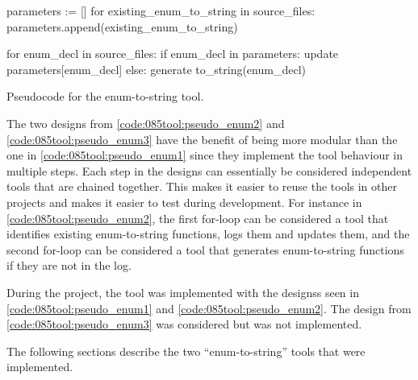 \begin{listing}[H]
    \begin{pythoncode}
parameters := []
for existing_enum_to_string in source_files:
    parameters.append(existing_enum_to_string)

for enum_decl in source_files:
    if enum_decl in parameters:
        update parameters[enum_decl]
    else:
        generate to_string(enum_decl)
    \end{pythoncode}
    \caption{Pseudocode for the enum-to-string tool.}
    \label{code:085tool:pseudo_enum3}
\end{listing}

The two designs from \cref{code:085tool:pseudo_enum2} and \cref{code:085tool:pseudo_enum3} have the benefit of being more modular than the one in \ref{code:085tool:pseudo_enum1} since they implement the tool behaviour in multiple steps.
Each step in the designs can essentially be considered independent tools that are chained together. This makes it easier to reuse the tools in other projects and makes it easier to test during development. For instance in \cref{code:085tool:pseudo_enum2}, the first for-loop can be considered a tool that identifies existing enum-to-string functions, logs them and updates them, and the second for-loop can be considered a tool that generates enum-to-string functions if they are not in the log.

During the project, the tool was implemented with the designss seen in \cref{code:085tool:pseudo_enum1} and \cref{code:085tool:pseudo_enum2}. The design from \cref{code:085tool:pseudo_enum3} was considered but was not implemented.

The following sections describe the two ``enum-to-string'' tools that were implemented.